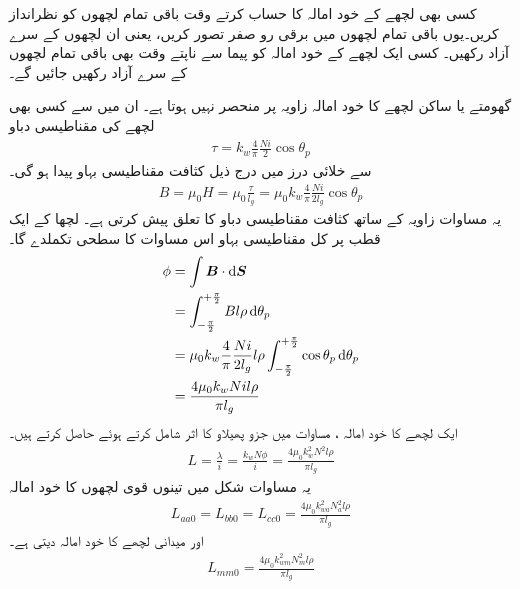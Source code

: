 کسی بھی لچھے کے خود امالہ کا حساب کرتے وقت باقی تمام لچھوں کو نظرانداز کریں۔یوں  باقی تمام لچھوں میں برقی رو صفر تصور کریں، یعنی ان لچھوں  کے سرے آزاد رکھیں۔ کسی ایک لچھے کے خود امالہ کو پیما سے ناپتے وقت بھی باقی تمام لچھوں کے سرے آزاد رکھیں جائیں گے۔ 


گھومتے یا ساکن لچھے کا خود امالہ  زاویہ  پر منحصر نہیں ہوتا ہے۔ ان میں سے کسی بھی لچھے کی مقناطیسی دباو  
\begin{align}
\tau=k_w \frac{4}{\pi}\frac{N i}{2} \cos \theta_p
\end{align}
سے خلائی درز میں درج ذیل  کثافت مقناطیسی بہاو   پیدا ہو گی۔	
\begin{align}
B=\mu_0 H=\mu_0 \frac{\tau}{l_g}=\mu_0 k_w \frac{4}{\pi}\frac{N i}{2 l_g} \cos \theta_p
\end{align}
یہ مساوات زاویہ  کے ساتھ  کثافت مقناطیسی دباو  کا تعلق پیش کرتی ہے۔ لچھا کے ایک قطب پر  کل مقناطیسی بہاو   اس مساوات کا سطحی تکملدے گا۔
\begin{gather}
\begin{aligned}\label{مساوات_معاصر_بہاو_بذریع_سطحی_تکمل}
\phi&=\int \kvec{B} \cdot \dif \kvec{S}\\
&=\int_{-\frac{\pi}{2}}^{+\frac{\pi}{2}} B l \rho \dif \theta_p\\
&=\mu_0 k_w \frac{4}{\pi}\frac{N i}{2 l_g} l \rho \int_{-\frac{\pi}{2}}^{+\frac{\pi}{2}}  \cos  \theta_p \dif \theta_p\\
&=\frac{4 \mu_0 k_w N i l \rho}{\pi l_g}
\end{aligned}
\end{gather}
ایک  لچھے کا خود امالہ ،  مساوات  میں جزو پھیلاو  کا اثر  شامل کرتے ہوئے  حاصل کرتے ہیں۔
\begin{align}
L=\frac{\lambda}{i}=\frac{k_w N \phi}{i}=\frac{4 \mu_0 k_w^2 N^2  l \rho}{\pi l_g}
\end{align}
یہ مساوات شکل  میں تینوں قوی لچھوں کا خود امالہ
\begin{align}\label{مساوات_معاصر_تین_ساکن_امالہ_برابر}
L_{aa0}=L_{bb0}=L_{cc0}=\frac{4 \mu_0 k_{wa}^2 N_a^2  l \rho}{\pi l_g}
\end{align}
اور  میدانی لچھے کا خود امالہ دیتی ہے۔
\begin{align}
L_{mm0}=\frac{4 \mu_0 k_{wm}^2 N_m^2  l \rho}{\pi l_g}
\end{align}


